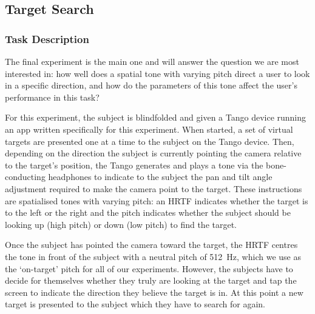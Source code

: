 \documentclass[format=sigconf, review=true, screen=true, anonymous=true]{acmart}
\begin{document}

\subsection{Target Search}

\subsubsection{Task Description}

The final experiment is the main one and will answer the question we are most interested in: how well does a spatial tone with varying pitch direct a user to look in a specific direction, and how do the parameters of this tone affect the user's performance in this task? %

For this experiment, the subject is blindfolded and given a Tango device running an app written specifically for this experiment. When started, a set of virtual targets are presented one at a time to the subject on the Tango device. Then, depending on the direction the subject is currently pointing the camera relative to the target's position, the Tango generates and plays a tone via the bone-conducting headphones to indicate to the subject the pan and tilt angle adjustment required to make the camera point to the target. These instructions are spatialised tones with varying pitch: an HRTF indicates whether the target is to the left or the right and the pitch indicates whether the subject should be looking up (high pitch) or down (low pitch) to find the target. 

Once the subject has pointed the camera toward the target, the HRTF centres the tone in front of the subject with a neutral pitch of \SI{512}{\hertz}, which we use as the `on-target' pitch for all of our experiments.  However, the subjects have to decide for themselves whether they truly are looking at the target and tap the screen to indicate the direction they believe the target is in. At this point a new target is presented to the subject which they have to search for again. 
\end{document}
